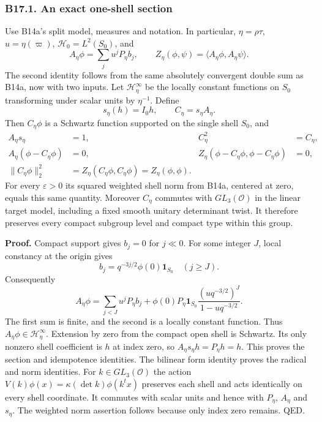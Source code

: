 \documentclass[11pt,a4paper]{article}
\theoremstyle{definition}
\begin{document}
\subsubsection{B17.1. An exact one-shell section}\label{b17.1.-an-exact-one-shell-section}

Use B14a's split model, measures and notation. In particular, \(\eta=\rho\tau\), \(u=\eta(\varpi)\), \(\mathcal H_0=L^2(S_0)\), and \[
 A_\eta\phi=\sum_j u^jP_\eta b_j,\qquad
 Z_\eta(\phi,\psi)=\langle A_\eta\phi,A_\eta\psi\rangle.
\] The second identity follows from the same absolutely convergent double sum as B14a, now with two inputs. Let \(\mathcal H_\eta^\infty\) be the locally constant functions on \(S_0\) transforming under scalar units by \(\eta^{-1}\). Define \[
 s_\eta(h)=I_0h,\qquad C_\eta=s_\eta A_\eta.
\] Then \(C_\eta\phi\) is a Schwartz function supported on the single shell \(S_0\), and \[
 \begin{aligned}
 A_\eta s_\eta&=1,& C_\eta^2&=C_\eta,\\
 A_\eta(\phi-C_\eta\phi)&=0,&
 Z_\eta(\phi-C_\eta\phi,\phi-C_\eta\phi)&=0,\\
 \|C_\eta\phi\|_2^2
 &=Z_\eta(C_\eta\phi,C_\eta\phi)
 =Z_\eta(\phi,\phi).
 \end{aligned}
\tag{B17.1}
\] For every \(\varepsilon>0\) its squared weighted shell norm from B14a, centered at zero, equals this same quantity. Moreover \(C_\eta\) commutes with \(GL_3(\mathcal O)\) in the linear target model, including a fixed smooth unitary determinant twist. It therefore preserves every compact subgroup level and compact type within this group.

\textbf{Proof.} Compact support gives \(b_j=0\) for \(j\ll0\). For some integer \(J\), local constancy at the origin gives \[
 b_j=q^{-3j/2}\phi(0)\mathbf1_{S_0}\quad(j\ge J).
\] Consequently \[
 A_\eta\phi
 =\sum_{j<J}u^jP_\eta b_j
 +\phi(0)P_\eta\mathbf1_{S_0}
       \frac{(u q^{-3/2})^J}{1-uq^{-3/2}}.
\tag{B17.2}
\] The first sum is finite, and the second is a locally constant function. Thus \(A_\eta\phi\in\mathcal H_\eta^\infty\). Extension by zero from the compact open shell is Schwartz. Its only nonzero shell coefficient is \(h\) at index zero, so \(A_\eta s_\eta h=P_\eta h=h\). This proves the section and idempotence identities. The bilinear form identity proves the radical and norm identities. For \(k\in GL_3(\mathcal O)\) the action \(V(k)\phi(x)=\kappa(\det k)\phi(k^t x)\) preserves each shell and acts identically on every shell coordinate. It commutes with scalar units and hence with \(P_\eta\), \(A_\eta\) and \(s_\eta\). The weighted norm assertion follows because only index zero remains. QED.
\end{document}
